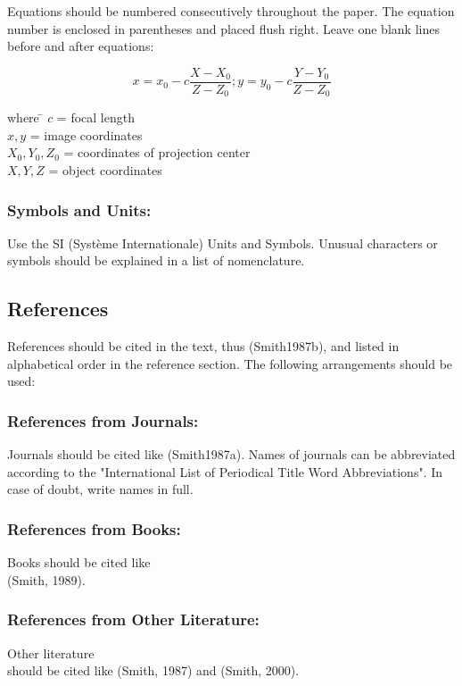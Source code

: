 \documentclass{isprs}
\begin{document}
Equations should be numbered consecutively throughout the paper. The equation 
number is enclosed in parentheses and placed flush right. Leave one blank lines 
before and after equations: 


\begin{equation}\label{equ:1}
	x = x_0 -c \frac{X - X_0}{Z - Z_0}; y = y_0 -c \frac{Y - Y_0}{Z - Z_0}
\end{equation}

\begin{tabbing} 
where \hspace{0.6cm} \= $c$ = focal length\\
\> $x,y$ = image coordinates\\
\> $X_0,Y_0, Z_0$ = coordinates of projection center\\
\> $X, Y, Z$ = object coordinates
\end{tabbing}

\subsubsection{Symbols and Units:}\label{sec:Symbols and Units}
Use the SI (Syst\`{e}me Internationale) Units and Symbols. Unusual characters 
or symbols should be explained in a list of nomenclature.


\subsection{References}\label{sec:References}
References should be cited in the text, thus (Smith1987b), and listed in alphabetical order in the reference section. The following arrangements should be used:

\subsubsection{References from Journals:} 
Journals should be cited like (Smith1987a). Names of journals can be abbreviated according to the "International List of Periodical Title Word Abbreviations". In case of doubt, write names in full.

\subsubsection{References from Books:} 
Books should be cited like \\ (Smith, 1989).

\subsubsection{References from Other Literature:}
Other literature \\ should be cited like (Smith, 1987) and (Smith, 2000).
\end{document}
